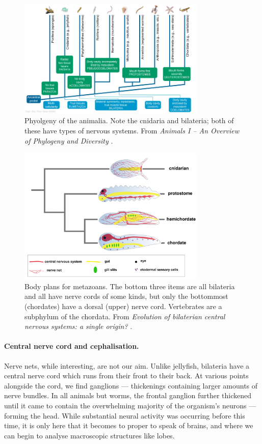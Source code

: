 \begin{figure}
	\centering
	\includegraphics[width=0.8\textwidth]{Figs/animalia.jpg}
	\caption{Phyolgeny of the animalia. Note the cnidaria and bilateria; both of these have types of nervous systems. From {\em Animals I -- An Overview of Phylogeny and Diversity} \cite{animalia}.}
	\label{fig:animalia}
\end{figure}

\begin{figure}
	\centering
	\includegraphics[width=0.8\textwidth]{Figs/chordata.jpg}
	\caption{Body plans for metazoans. The bottom three items are all bilateria and all have nerve cords of some kinds, but only the bottommost (chordates) have a dorsal (upper) nerve cord. Vertebrates are a subphylum of the chordata. From {\em Evolution of bilaterian central nervous systems: a single origin?} \cite[p.\ 3]{chordata}.}
	\label{fig:chordata}
\end{figure}

\paragraph{Central nerve cord and cephalisation.} Nerve nets, while interesting, are not our aim. Unlike jellyfish, bilateria have a central nerve cord which runs from their front to their back. At various points alongside the cord, we find ganglions --- thickenings containing larger amounts of nerve bundles. In all animals but worms, the frontal ganglion further thickened until it came to contain the overwhelming majority of the organism's neurons --- forming the head. While substantial neural activity was occurring before this time, it is only here that it becomes to proper to speak of brains, and where we can begin to analyse macroscopic structures like lobes.

